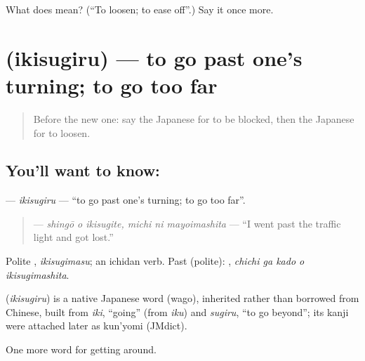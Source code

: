 \begin{tcolorbox}[breakable,colback=teal!4,colframe=teal!35!black,title={Before you move on}]
What does  mean? (\textquotedblleft{}To loosen; to ease off\textquotedblright{}.) Say it once more.
\end{tcolorbox}
\section[\texorpdfstring{\ja{いきすぎる} (ikisugiru)}{いきすぎる (ikisugiru)}]{ (ikisugiru) — to go past one's turning; to go too far}

\label{lesson:JA-C395-ikisugiru}



\begin{quote}
Before the new one: say the Japanese for to be blocked, then the Japanese for to loosen.
\end{quote}

\subsection*{You'll want to know: }
\textbf{} — \emph{ikisugiru} — \textquotedblleft{}to go past one's turning; to go too far\textquotedblright{}.

\begin{quote}
\textbf{  } — \emph{shingō o ikisugite, michi ni mayoimashita} — \textquotedblleft{}I went past the traffic light and got lost.\textquotedblright{}
\end{quote}

Polite \textbf{}, \emph{ikisugimasu}; an ichidan verb. Past (polite): \textbf{  }, \emph{chichi ga kado o ikisugimashita}.

\begin{cousinweb}
\textbf{} (\emph{ikisugiru}) is a native Japanese word (wago), inherited rather than borrowed from Chinese, built from \emph{iki}, \textquotedblleft{}going\textquotedblright{} (from \emph{iku}) and \emph{sugiru}, \textquotedblleft{}to go beyond\textquotedblright{}; its kanji were attached later as kun'yomi (JMdict).
\end{cousinweb}

\begin{grammarlens}[title={What you've built}]
One more word for getting around.
\end{grammarlens}

